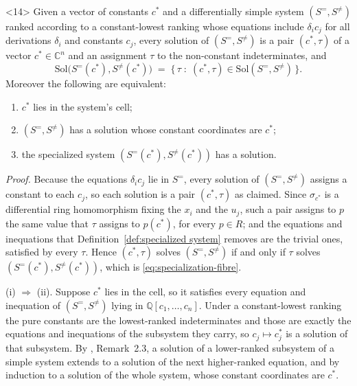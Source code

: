 \documentclass{article}
\theoremstyle{definition}
\theoremstyle{plain}
\begin{document}
      \medskip
      \begin{lemma}<14>
      \label{lem:cell-solution}
      Given a vector of constants $c^*$ and a differentially simple system
      $(S^=, S^{\ne})$ ranked according to a constant-lowest ranking whose equations
      include $\delta_i c_j$ for all derivations $\delta_i$ and constants $c_j$,
      every solution of $(S^=, S^{\ne})$ is a pair $(c^*, \tau)$ of a vector
      $c^* \in \mathbb{C}^n$ and an assignment $\tau$ to the non-constant
      indeterminates, and
      \begin{equation}
      \label{eq:specialization-fibre}
      \mathrm{Sol}\bigl(S^=(c^*), S^{\ne}(c^*)\bigr)
        \;=\; \{\, \tau \;:\; (c^*, \tau) \in \mathrm{Sol}(S^=, S^{\ne}) \,\} .
      \end{equation}
      Moreover the following are equivalent:
      \begin{enumerate}
      \item[\rm(i)]   $c^*$ lies in the system's cell;
      \item[\rm(ii)]  $(S^=, S^{\ne})$ has a solution whose constant coordinates are $c^*$;
      \item[\rm(iii)] the specialized system $(S^=(c^*), S^{\ne}(c^*))$ has a solution.
      \end{enumerate}
      \end{lemma}

  {\it Proof.}
  Because the equations $\delta_i c_j$ lie in $S^=$, every solution of
  $(S^=, S^{\ne})$ assigns a constant to each $c_j$, so each solution is a pair
  $(c^*, \tau)$ as claimed.  Since $\sigma_{c^*}$ is a differential ring
  homomorphism fixing the $x_i$ and the $u_j$, such a pair assigns to $p$ the same
  value that $\tau$ assigns to $p(c^*)$, for every $p \in R$; and the equations and
  inequations that Definition~\ref{def:specialized system} removes are the trivial
  ones, satisfied by every $\tau$.  Hence $(c^*, \tau)$ solves $(S^=, S^{\ne})$ if
  and only if $\tau$ solves $(S^=(c^*), S^{\ne}(c^*))$, which is
  \eqref{eq:specialization-fibre}.

  (i) $\Rightarrow$ (ii).  Suppose $c^*$ lies in the cell, so it satisfies every
  equation and inequation of $(S^=, S^{\ne})$ lying in
  $\mathbb{Q}[c_1, \ldots, c_n]$.  Under a constant-lowest ranking the pure
  constants are the lowest-ranked indeterminates and those are exactly the
  equations and inequations of the subsystem they carry, so $c_j \mapsto c^*_j$ is
  a solution of that subsystem.  By \cite{ThomasDecomp}, Remark~2.3, a solution of
  a lower-ranked subsystem of a simple system extends to a solution of the next
  higher-ranked equation, and by induction to a solution of the whole system,
  whose constant coordinates are $c^*$.
\end{document}
